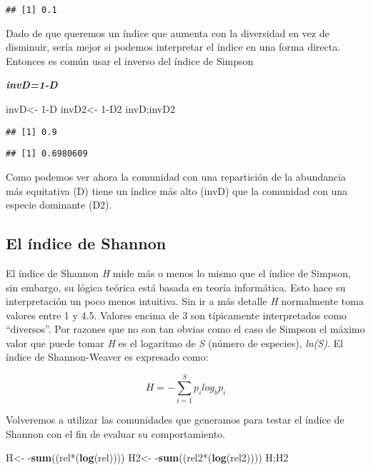 \documentclass[]{book}
\newenvironment{Shaded}{\begin{snugshade}}{\end{snugshade}}
\newcommand{\KeywordTok}[1]{\textcolor[rgb]{0.13,0.29,0.53}{\textbf{{#1}}}}
\newcommand{\DecValTok}[1]{\textcolor[rgb]{0.00,0.00,0.81}{{#1}}}
\newcommand{\StringTok}[1]{\textcolor[rgb]{0.31,0.60,0.02}{{#1}}}
\newcommand{\NormalTok}[1]{{#1}}
\begin{document}
\begin{verbatim}
## [1] 0.1
\end{verbatim}

Dado de que queremos un índice que aumenta con la diversidad en vez de
disminuir, sería mejor si podemos interpretar el índice en una forma
directa. Entonces es común usar el inverso del índice de Simpson

\textbf{\emph{invD=1-D}}

\begin{Shaded}
\begin{Highlighting}[]
\NormalTok{invD<-}\StringTok{ }\DecValTok{1}\NormalTok{-D}
\NormalTok{invD2<-}\StringTok{ }\DecValTok{1}\NormalTok{-D2}
\NormalTok{invD;invD2}
\end{Highlighting}
\end{Shaded}

\begin{verbatim}
## [1] 0.9
\end{verbatim}

\begin{verbatim}
## [1] 0.6980609
\end{verbatim}

Como podemos ver ahora la comunidad con una repartición de la abundancia
más equitativa (D) tiene un índice más alto (invD) que la comunidad con
una especie dominante (D2).

\subsection{El índice de Shannon}\label{el-indice-de-shannon}

El índice de Shannon \emph{H} mide más o menos lo mismo que el índice de
Simpson, sin embargo, su lógica teórica está basada en teoría
informática. Esto hace su interpretación un poco menos intuitiva. Sin ir
a más detalle \emph{H} normalmente toma valores entre 1 y 4.5. Valores
encima de 3 son típicamente interpretados como ``diversos''. Por razones
que no son tan obvias como el caso de Simpson el máximo valor que puede
tomar \emph{H} es el logaritmo de \emph{S} (número de especies),
\emph{ln(S)}. El índice de Shannon-Weaver es expresado como:

\[
H=-\sum_{i=1}^S p_ilog_bp_i
\]

Volveremos a utilizar las comunidades que generamos para testar el
índice de Shannon con el fin de evaluar su comportamiento.

\begin{Shaded}
\begin{Highlighting}[]
\NormalTok{H<-}\StringTok{ }\NormalTok{-}\KeywordTok{sum}\NormalTok{((rel*(}\KeywordTok{log}\NormalTok{(rel))))}
\NormalTok{H2<-}\StringTok{ }\NormalTok{-}\KeywordTok{sum}\NormalTok{((rel2*(}\KeywordTok{log}\NormalTok{(rel2))))}
\NormalTok{H;H2}
\end{Highlighting}
\end{Shaded}
\end{document}
